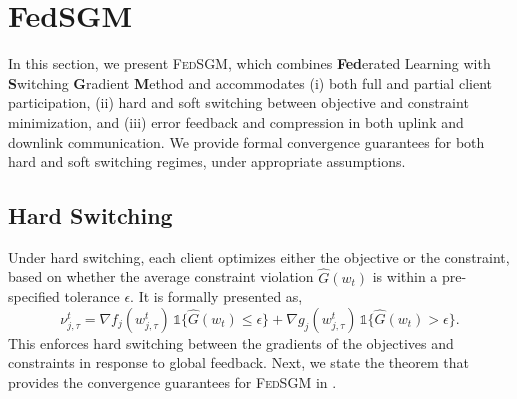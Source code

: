 \documentclass{article} %
\begin{document}
\section{FedSGM}\label{sec:fedsgm}
In this section, we present \textsc{FedSGM}, which combines \textbf{Fed}erated Learning with \textbf{S}witching \textbf{G}radient \textbf{M}ethod and accommodates (i) both full and partial client participation, (ii) hard and soft switching between objective and constraint minimization, and (iii) error feedback and compression in both uplink and downlink communication. We provide formal convergence guarantees for both hard and soft switching regimes, under appropriate assumptions.
\subsection{Hard Switching}
Under hard switching, each client optimizes either the objective or the constraint, based on whether the average constraint violation $\hat{G}(w_t)$ is within a pre-specified tolerance $\epsilon$. It is formally presented as,
\vspace{-2.2mm}
$$
    \nu_{j,\tau}^t = 
    \nabla f_j(w_{j,\tau}^t)\, \mathds{1}\{\hat{G}(w_t) \leq \epsilon\} +
    \nabla g_j(w_{j,\tau}^t)\, \mathds{1}\{\hat{G}(w_t) > \epsilon\}.
$$
This enforces hard switching between the gradients of the objectives and constraints in response to global feedback. Next, we state the theorem that provides the convergence guarantees for \textsc{FedSGM} in . 
\end{document}
